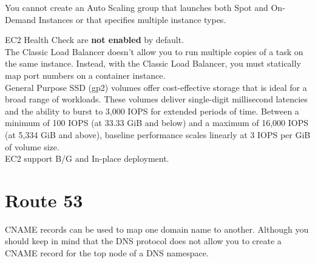 \documentclass[12pt, letterpaper, twoside]{article}
\begin{document}

You cannot create an Auto Scaling group that launches both Spot and On-Demand Instances or that specifies multiple instance types.

EC2 Health Check are \textbf{not enabled} by default.\\

The Classic Load Balancer doesn't allow you to run multiple copies of a task on the same instance. Instead, with the Classic Load Balancer, 
you must statically map port numbers on a container instance.\\

General Purpose SSD (gp2) volumes offer cost-effective storage that is ideal for a broad range of workloads. These volumes deliver single-digit millisecond 
latencies and the ability to burst to 3,000 IOPS for extended periods of time. Between a minimum of 100 IOPS (at 33.33 GiB and below) and a maximum of 
16,000 IOPS (at 5,334 GiB and above), baseline performance scales linearly at 3 IOPS per GiB of volume size.\\

EC2 support B/G and In-place deployment.\\

\section{Route 53}
CNAME records can be used to map one domain name to another. Although you should keep in mind that the DNS 
protocol does not allow you to create a CNAME record for the top node of a DNS namespace.\\
\end{document}
